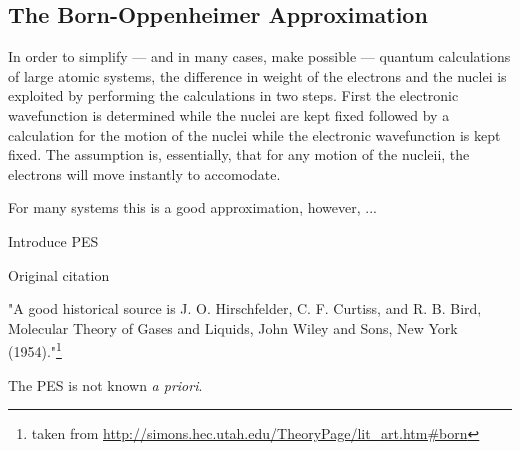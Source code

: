 \subsection{The Born-Oppenheimer Approximation}
\label{sec:born-oppenheimer}

In order to simplify --- and in many cases, make possible --- quantum calculations of large atomic systems, the difference in weight of the electrons and the nuclei is exploited by performing the calculations in two steps.
First the electronic wavefunction is determined while the nuclei are kept fixed followed by a calculation for the motion of the nuclei while the electronic wavefunction is kept fixed.
The assumption is, essentially, that for any motion of the nucleii, the electrons will move instantly to accomodate.

For many systems this is a good approximation, however, ...

\bit
\item Introduce PES
\item Original citation~\cite{born-oppenheimer-1927}
\item "A good historical source is J. O. Hirschfelder, C. F. Curtiss, and R. B. Bird, Molecular Theory of Gases and Liquids, John Wiley and Sons, New York (1954)."\footnote{taken from \url{http://simons.hec.utah.edu/TheoryPage/lit_art.htm\#born}}
\item The PES is not known \textit{a priori}.
\eit

\incomplete
